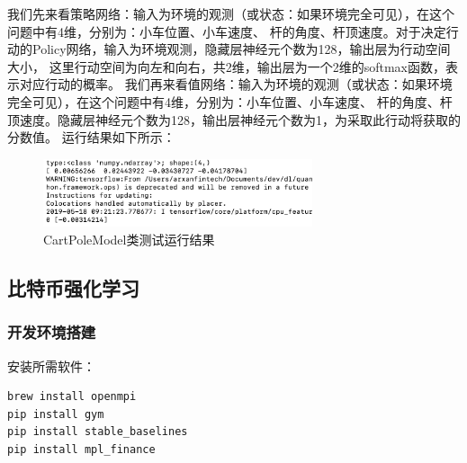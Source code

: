 \documentclass{article}
\begin{document}
我们先来看策略网络：输入为环境的观测（或状态：如果环境完全可见），在这个问题中有4维，分别为：小车位置、小车速度、
杆的角度、杆顶速度。对于决定行动的Policy网络，输入为环境观测，隐藏层神经元个数为128，输出层为行动空间大小，
这里行动空间为向左和向右，共2维，输出层为一个2维的softmax函数，表示对应行动的概率。\newline
我们再来看值网络：输入为环境的观测（或状态：如果环境完全可见），在这个问题中有4维，分别为：小车位置、小车速度、
杆的角度、杆顶速度。隐藏层神经元个数为128，输出层神经元个数为1，为采取此行动将获取的分数值。\newline
运行结果如下所示：
\begin{figure}[H]
    \caption{CartPoleModel类测试运行结果}
    \label{f000073}
    \centering
    \includegraphics[height=2cm]{images/f000073}
\end{figure}







\subsection{比特币强化学习}
\subsubsection{开发环境搭建}
安装所需软件：
\lstset{language=BASH}
\begin{lstlisting}
brew install openmpi
pip install gym
pip install stable_baselines
pip install mpl_finance
\end{lstlisting}
\end{document}

